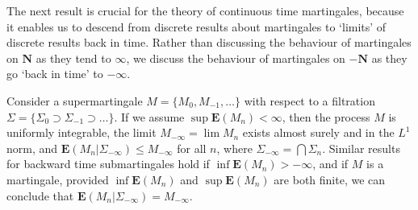 The next result is crucial for the theory of continuous time martingales, because it enables us to descend from discrete results about martingales to `limits' of discrete results back in time. Rather than discussing the behaviour of martingales on $\mathbf{N}$ as they tend to $\infty$, we discuss the behaviour of martingales on $-\mathbf{N}$ as they go `back in time' to $-\infty$.

\begin{theorem}
    Consider a supermartingale $M = \{ M_0, M_{-1}, \dots \}$ with respect to a filtration $\Sigma = \{ \Sigma_0 \supset \Sigma_{-1} \supset \dots \}$. If we assume $\sup \mathbf{E}(M_n) < \infty$, then the process $M$ is uniformly integrable, the limit $M_{-\infty} = \lim M_n$ exists almost surely and in the $L^1$ norm, and $\mathbf{E}(M_n|\Sigma_{-\infty}) \leq M_{-\infty}$ for all $n$, where $\Sigma_{-\infty} = \bigcap \Sigma_n$. Similar results for backward time submartingales hold if $\inf \mathbf{E}(M_n) > -\infty$, and if $M$ is a martingale, provided $\inf \mathbf{E}(M_n)$ and $\sup \mathbf{E}(M_n)$ are both finite, we can conclude that $\mathbf{E}(M_n|\Sigma_{-\infty}) = M_{-\infty}$.
\end{theorem}
